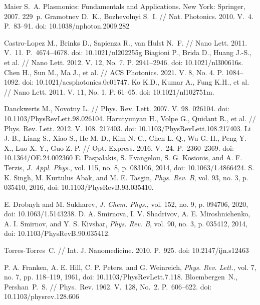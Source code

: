 \documentclass[12pt, a4paper]{article}
\begin{document}
\newpage
\begin{thebibliography}{99}
Maier S.~A. Plasmonics: Fundamentals and Applications. New York: Springer, 2007. 229~p.
Gramotnev D.~K., Bozhevolnyi S.~I. // Nat. Photonics. 2010. V.~4. P.~83--91. doi: 10.1038/nphoton.2009.282

Castro-Lopez M., Brinks D., Sapienza R., van Hulst N.~F. // Nano Lett. 2011. V.~11. P.~4674--4678. doi: 10.1021/nl202255g
Biagioni P., Brida D., Huang J.-S., et al. // Nano Lett. 2012. V. 12, No. 7. P. 2941–2946. doi: 10.1021/nl300616s.
Chen H., Sun M., Ma J., et al. // ACS Photonics. 2021. V. 8, No. 4. P. 1084–1092. doi: 10.1021/acsphotonics.0c01747.
Ko K.D., Kumar A., Fung K.H., et al. // Nano Lett. 2011. V. 11, No. 1. P. 61–65. doi: 10.1021/nl102751m.

Danckwerts M., Novotny L. // Phys. Rev. Lett. 2007. V. 98. 026104. doi: 10.1103/PhysRevLett.98.026104.
Harutyunyan H., Volpe G., Quidant R., et al. // Phys. Rev. Lett. 2012. V. 108. 217403. doi: 10.1103/PhysRevLett.108.217403.
Li J.-B., Liang S., Xiao S., He M.-D., Kim N.-C., Chen L.-Q., Wu G.-H., Peng Y.-X., Luo X.-Y., Guo Z.-P. // Opt. Express. 2016. V.~24. P.~2360--2369. doi: 10.1364/OE.24.002360
E. Paspalakis, S. Evangelou, S. G. Kosionis, and A. F. Terzis, \textit{J. Appl. Phys.}, vol. 115, no. 8, p. 083106, 2014, doi: 10.1063/1.4866424.
S. K. Singh, M. Kurtulus Abak, and M. E. Tasgin, \textit{Phys. Rev. B}, vol. 93, no. 3, p. 035410, 2016, doi: 10.1103/PhysRevB.93.035410.

E. Drobnyh and M. Sukharev, \textit{J. Chem. Phys.}, vol. 152, no. 9, p. 094706, 2020, doi: 10.1063/1.5143238.
D. A. Smirnova, I. V. Shadrivov, A. E. Miroshnichenko, A. I. Smirnov, and Y. S. Kivshar, \textit{Phys. Rev. B}, vol. 90, no. 3, p. 035412, 2014, doi: 10.1103/PhysRevB.90.035412.

Torres-Torres~C. // Int. J. Nanomedicine. 2010. P.~925. doi: 10.2147/ijn.s12463

P. A. Franken, A. E. Hill, C. P. Peters, and G. Weinreich, \textit{Phys. Rev. Lett.}, vol. 7, no. 7, pp. 118–119, 1961, doi: 10.1103/PhysRevLett.7.118.
Bloembergen~N., Pershan~P.~S. // Phys.~Rev. 1962. V.~128, No.~2. P.~606--622. 
doi: 10.1103/physrev.128.606


\end{thebibliography}
\end{document}
